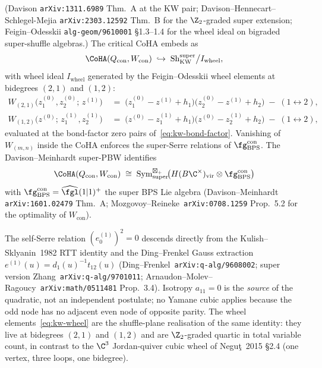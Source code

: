 \begin{theorem}
\label{thm:kw-davison-shuffle}
\textup{(}Davison \texttt{arXiv:1311.6989} Thm.~A at the KW pair; Davison--Hennecart--Schlegel-Mejia \texttt{arXiv:2303.12592} Thm.~B for the $\Z_2$-graded super extension; Feigin--Odesskii \texttt{alg-geom/9610001} \S1.3--1.4 for the wheel ideal on bigraded super-shuffle algebras.\textup{)} The critical CoHA embeds as
\begin{equation}
\label{eq:davison-wheel-quotient}
 \CoHA(Q_{\mathrm{con}}, W_{\mathrm{con}})
 \;\hookrightarrow\;
 \mathrm{Sh}^{\mathrm{super}}_{\mathrm{KW}} \big/ I_{\mathrm{wheel}},
\end{equation}
with wheel ideal $I_{\mathrm{wheel}}$ generated by the Feigin--Odesskii wheel elements at bidegrees $(2, 1)$ and $(1, 2)$:
\begin{equation}
\label{eq:kw-wheel}
\begin{aligned}
 W_{(2,1)}\bigl(z^{(0)}_1, z^{(0)}_2;\, z^{(1)}\bigr)
 &\;=\; \bigl(z^{(0)}_1 - z^{(1)} + h_1\bigr)\bigl(z^{(0)}_2 - z^{(1)} + h_2\bigr)
 \;-\; (1 \leftrightarrow 2), \\
 W_{(1,2)}\bigl(z^{(0)};\, z^{(1)}_1, z^{(1)}_2\bigr)
 &\;=\; \bigl(z^{(0)} - z^{(1)}_1 + h_1\bigr)\bigl(z^{(0)} - z^{(1)}_2 + h_2\bigr)
 \;-\; (1 \leftrightarrow 2),
\end{aligned}
\end{equation}
evaluated at the bond-factor zero pairs of~\eqref{eq:kw-bond-factor}. Vanishing of $W_{(m, n)}$ inside the CoHA enforces the super-Serre relations of $\fg_{\mathrm{BPS}}^{\mathrm{con}}$. The Davison--Meinhardt super-PBW identifies
\[
 \CoHA(Q_{\mathrm{con}}, W_{\mathrm{con}})
 \;\cong\;
 \mathrm{Sym}^{\boxtimes_+}_{\mathrm{super}}\!
 \bigl(H(B\C^\times)_{\mathrm{vir}} \otimes \fg_{\mathrm{BPS}}^{\mathrm{con}}\bigr)
\]
with $\fg_{\mathrm{BPS}}^{\mathrm{con}} = \widehat{\fgl}(1|1)^+$ the super BPS Lie algebra (Davison--Meinhardt \texttt{arXiv:1601.02479} Thm.~A; Mozgovoy--Reineke~\texttt{arXiv:0708.1259} Prop.~5.2 for the optimality of $W_{\mathrm{con}}$).
\end{theorem}

\begin{remark}
\label{rem:kw-quadratic-serre}
The self-Serre relation $(e^{(1)}_0)^2 = 0$ descends directly from the Kulish--Sklyanin~1982 RTT identity and the Ding--Frenkel Gauss extraction $e^{(1)}(u) = d_1(u)^{-1} t_{12}(u)$ (Ding--Frenkel~\texttt{arXiv:q-alg/9608002}; super version Zhang~\texttt{arXiv:q-alg/9701011}; Arnaudon--Molev--Ragoucy~\texttt{arXiv:math/0511481} Prop.~3.4). Isotropy $a_{11} = 0$ is the \emph{source} of the quadratic, not an independent postulate; no Yamane cubic applies because the odd node has no adjacent even node of opposite parity. The wheel elements~\eqref{eq:kw-wheel} are the shuffle-plane realisation of the same identity: they live at bidegrees $(2,1)$ and $(1,2)$ and are $\Z_2$-graded quartic in total variable count, in contrast to the $\C^3$ Jordan-quiver cubic wheel of Negu\c{t}~2015 \S2.4 (one vertex, three loops, one bidegree).
\end{remark}

